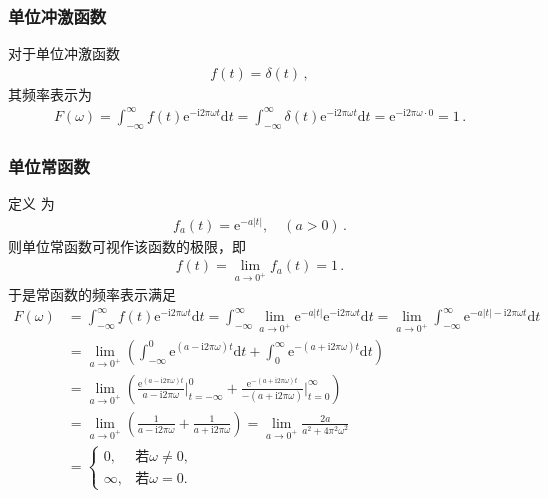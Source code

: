 \subsubsection*{单位冲激函数}
对于单位冲激函数
\begin{align}
    f(t)=\delta(t)\, ,
\end{align}
其频率表示为
\begin{align}
    F(\omega)=\int_{-\infty}^{\infty}f(t)\mathrm{e}^{-\mathrm{i}2\pi\omega t}\mathrm{d}t
    =\int_{-\infty}^{\infty}\delta(t)\mathrm{e}^{-\mathrm{i}2\pi\omega t}\mathrm{d}t
    =\mathrm{e}^{-\mathrm{i}2\pi\omega\cdot0}
    =1\, .
\end{align}
\subsubsection*{单位常函数}
定义
为
\begin{align}
    f_a(t)=\mathrm{e}^{-a|t|},\quad (a>0)\, .
\end{align}
则单位常函数可视作该函数的极限，即
\begin{align}
    f(t)=\lim\limits_{a\rightarrow0^+}f_a(t)=1\, .
\end{align}
于是常函数的频率表示满足
\begin{align}
    F(\omega) & =\int_{-\infty}^{\infty}f(t)\mathrm{e}^{-\mathrm{i}2\pi\omega t}\mathrm{d}t
    =\int_{-\infty}^{\infty}\lim\limits_{a\rightarrow0^+}\mathrm{e}^{-a|t|}\mathrm{e}^{-\mathrm{i}2\pi\omega t}\mathrm{d}t
    =\lim\limits_{a\rightarrow0^+}\int_{-\infty}^{\infty}\mathrm{e}^{-a|t|-\mathrm{i}2\pi\omega t}\mathrm{d}t\nonumber                                                                                  \\
              & =\lim\limits_{a\rightarrow0^+}\left(\int_{-\infty}^0\mathrm{e}^{(a-\mathrm{i}2\pi\omega)t}\mathrm{d}t+\int_0^{\infty}\mathrm{e}^{-(a+\mathrm{i}2\pi\omega)t}\mathrm{d}t\right)\nonumber \\
              & =\lim\limits_{a\rightarrow0^+}\left(\frac{\mathrm{e}^{(a-\mathrm{i}2\pi\omega)t}}{a-\mathrm{i}2\pi\omega}\bigg|_{t=-\infty}^0
    +\frac{\mathrm{e}^{-(a+\mathrm{i}2\pi\omega)t}}{-(a+\mathrm{i}2\pi\omega)}\bigg|_{t=0}^{\infty}\right)\nonumber                                                                                     \\
              & =\lim\limits_{a\rightarrow0^+}\left(\frac{1}{a-\mathrm{i}2\pi\omega}+\frac{1}{a+\mathrm{i}2\pi\omega}\right)=\lim\limits_{a\rightarrow0^+}\frac{2a}{a^2+4\pi^2\omega^2}\nonumber        \\
              & =\left\{\begin{array}{ll}
        0,      & \text{若}\omega\neq0, \\
        \infty, & \text{若}\omega=0.
    \end{array}\right.
\end{align}
